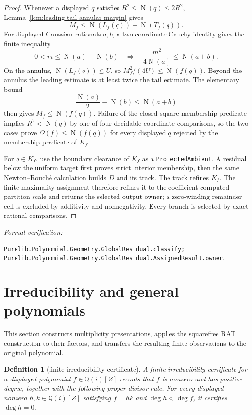 \documentclass[11pt]{article}
\newtheorem{definition}[theorem]{Definition}
\newcommand{\Qi}{\mathbb{Q}(i)}
\newcommand{\Norm}[1]{\operatorname{N}\!\left(#1\right)}
\newcommand{\leanref}[1]{\par\smallskip\noindent
  \emph{Formal verification:}\par\nobreak
  {\raggedright\nolinkurl{#1}.\par}}
\begin{document}
\begin{proof}
Whenever a displayed $q$ satisfies
$R^2\le\Norm q\le2R^2$,
Lemma~\ref{lem:leading-tail-annular-margin} gives
\[
 M_f\le \Norm{L_f(q)}-\Norm{T_f(q)}.
\]
For displayed Gaussian rationals $a,b$, a
two-coordinate Cauchy identity gives the finite inequality
\[
 0<m\le\Norm a-\Norm b
 \quad\Longrightarrow\quad
 \frac{m^2}{4\Norm a}\le\Norm{a+b}.
\]
On the annulus, $\Norm{L_f(q)}\le U$, so
$M_f^2/(4U)\le\Norm{f(q)}$.  Beyond the annulus the leading estimate is at
least twice the tail estimate.  The elementary bound
\[
 \frac{\Norm a}{2}-\Norm b\le\Norm{a+b}
\]
then gives $M_f\le\Norm{f(q)}$.  Failure of the closed-square membership
predicate implies
$R^2<\Norm q$ by one of four decidable coordinate comparisons, so the two
cases prove $\Omega(f)\le\Norm{f(q)}$ for every displayed $q$ rejected by
the membership predicate of $K_f$.

For $q\in K_f$, use the boundary clearance of $K_f$ as a
\texttt{ProtectedAmbient}.  A residual below the uniform target first proves
strict interior membership, then the same Newton--Rouch\'e calculation builds
$D$ and its track.  The track refines $K_f$.  The finite maximality assignment
therefore refines it to the coefficient-computed partition scale and returns
the selected output owner; a zero-winding remainder cell is excluded by
additivity and nonnegativity.  Every branch is selected by exact rational
comparisons.
\end{proof}

\leanref{Purelib.Polynomial.Geometry.GlobalResidual.classify;
Purelib.Polynomial.Geometry.GlobalResidual.AssignedResult.owner}

\section{Irreducibility and general polynomials}
\label{sec:general-polynomials}

This section constructs multiplicity presentations, applies the squarefree
RAT construction to their factors, and transfers the resulting finite
observations to the original polynomial.

\begin{definition}[finite irreducibility certificate]
\label{def:irreducibility-certificate}
A \emph{finite irreducibility certificate} for a displayed polynomial
$f\in\Qi[Z]$ records that $f$ is nonzero and has positive degree, together
with the following proper-divisor rule.  For every displayed nonzero
$h,k\in\Qi[Z]$ satisfying $f=hk$ and $\deg h<\deg f$, it certifies
$\deg h=0$.
\end{definition}
\end{document}
